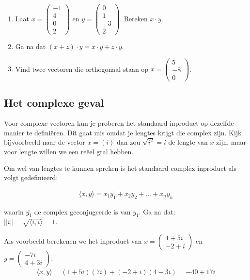 \documentclass[../../main.tex]{subfiles}
\begin{document}
\begin{opdracht}
\begin{enumerate}
    \item Laat $x=\begin{pmatrix}-1\\4\\0\\2\end{pmatrix}$ en $y=\begin{pmatrix}0\\1\\-3\\2\end{pmatrix}$. Bereken $x\cdot y$.
    \item Ga na dat $(x+z)\cdot y=x\cdot y+ z\cdot y$.
    \item Vind twee vectoren die orthogonaal staan op $x=\begin{pmatrix}5\\-8\\0\end{pmatrix}$.
\end{enumerate}
\end{opdracht}
\subsection*{Het complexe geval}
Voor complexe vectoren kun je proberen het standaard inproduct op dezelfde manier te definiëren. Dit gaat mis omdat je lengtes krijgt die complex zijn. Kijk bijvoorbeeld naar de vector $x= (i)$ dan zou $\sqrt{i^2}=i$ de lengte van $x$ zijn, maar voor lengte willen we een re\"eel gtal hebben.

Om wel van lengtes te kunnen spreken is het standaard complex inproduct als volgt gedefinieerd:

\[\begin{aligned}\langle x,y\rangle=x_1\overline{y_1}+x_2\overline{y_2}+\ldots+x_n\overline{y_n}\end{aligned}\]

waarin $\overline{y_1}$ de complex geconjugeerde is van $y_1$. Ga na dat:\\
$||i||=\sqrt{\langle i,i\rangle}=1$.


Als voorbeeld berekenen we het inproduct van $x=\begin{pmatrix}1+5i\\-2+i\end{pmatrix}$ en $y=\begin{pmatrix}-7i\\4+3i\end{pmatrix}$:
\[\begin{aligned}\langle x,y\rangle=(1+5i)(7i)+(-2+i)(4-3i)=-40+17i\end{aligned}\]
\end{document}
